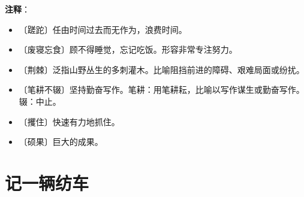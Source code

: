 \documentclass[12pt,UTF-8,openany]{ctexbook}
\begin{document}
\newpage

\textbf{注释}：

\vspace{-1em}

\begin{itemize}
    \setlength\itemsep{-0.2em}
    \item 〔蹉跎〕任由时间过去而无作为，浪费时间。
    \item 〔废寝忘食〕顾不得睡觉，忘记吃饭。形容非常专注努力。
    \item 〔荆棘〕泛指山野丛生的多刺灌木。比喻阻挡前进的障碍、艰难局面或纷扰。
    \item 〔笔耕不辍〕坚持勤奋写作。笔耕：用笔耕耘，比喻以写作谋生或勤奋写作。辍：中止。
    \item 〔攫住〕快速有力地抓住。
    \item 〔硕果〕巨大的成果。
\end{itemize}

\chapter{记一辆纺车}
\end{document}
